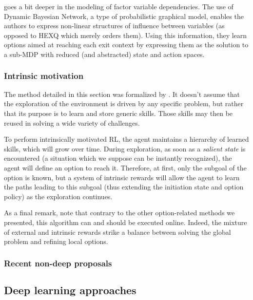 \documentclass{article}
\begin{document}
\cite{jonsson_causal_2006} goes a bit deeper in the modeling of factor variable dependencies. The use of Dynamic Bayesian Network, a type of probabilistic graphical model, enables the authors to express non-linear structures of influence between variables (as opposed to HEXQ which merely orders them). Using this information, they learn options aimed at reaching each exit context by expressing them as the solution to a sub-MDP with reduced (and abstracted) state and action spaces.

\subsubsection{Intrinsic motivation}

The method detailed in this section was formalized by \cite{chentanez_intrinsically_2005}. It doesn't assume that the exploration of the environment is driven by any specific problem, but rather that its purpose is to learn and store generic skills. Those skills may then be reused in solving a wide variety of challenges.

To perform intrinsically motivated RL, the agent maintains a hierarchy of learned skills, which will grow over time. During exploration, as soon as a \textit{salient state} is encountered (a situation which we suppose can be instantly recognized), the agent will define an option to reach it. Therefore, at first, only the subgoal of the option is known, but a system of intrinsic rewards will allow the agent to learn the paths leading to this subgoal (thus extending the initiation state and option policy) as the exploration continues.

As a final remark, note that contrary to the other option-related methods we presented, this algorithm can and should be executed online. Indeed, the mixture of external and intrinsic rewards strike a balance between solving the global problem and refining local options.

\subsubsection{Recent non-deep proposals}



\subsection{Deep learning approaches}
\end{document}
